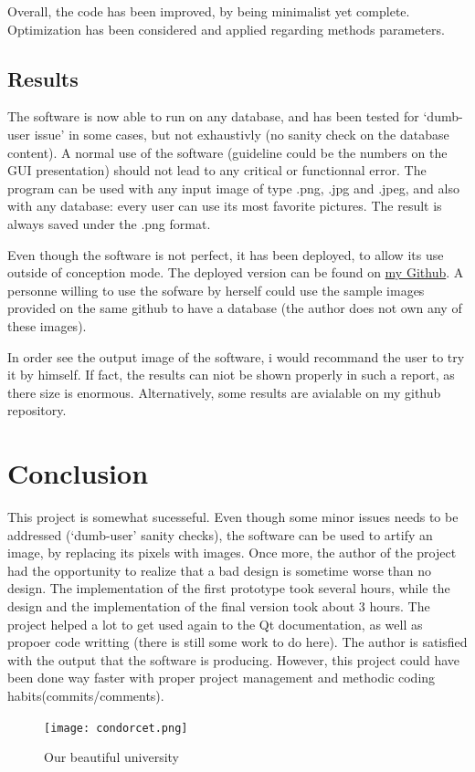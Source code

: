 \documentclass[aps,letterpaper,11pt]{revtex4}
\begin{document}
Overall, the code has been improved, by being minimalist yet complete. Optimization has been considered and applied regarding methods parameters. 

\subsection{Results}
The software is now able to run on any database, and has been tested for `dumb-user issue' in some cases, but not exhaustivly (no sanity check on the database content). A normal use of the software (guideline could be the numbers on the GUI presentation) should not lead to any critical or functionnal error. 
The program can be used with any input image of type .png, .jpg and .jpeg, and also with any database: every user can use its most favorite pictures. The result is always saved under the .png format.

Even though the software is not perfect, it has been deployed, to allow its use outside of conception mode. The deployed version can be found on  \href{https://github.com/AntoineMerlet/ProjectCXX/blob/master/Deploy.zip}{my Github}. A personne willing to use the sofware by herself could use the sample images provided on the same github to have a database (the author does not own any of these images).

In order see the output image of the software, i would recommand the user to try it by himself. If fact, the results can niot be shown properly in such a report, as there size is enormous. Alternatively, some results are avialable on my github repository.


\section{Conclusion}
This project is somewhat sucesseful. Even though some minor issues needs to be addressed (`dumb-user' sanity checks), the software can be used to artify an image, by replacing its pixels with images.
Once more, the author of the project had the opportunity to realize that a bad design is sometime worse than no design. The implementation of the first prototype took several hours, while the design and the implementation of the final version took about 3 hours.
The project helped a lot to get used again to the Qt documentation, as well as propoer code writting (there is still some work to do here).
The author is satisfied with the output that the software is producing. However, this project could have been done way faster with proper project management and methodic coding habits(commits/comments).  
 

\begin{figure}[H]
	\centering
	\texttt{[image: condorcet.png]}
	\caption{Our beautiful university}   
\end{figure}
\end{document}
